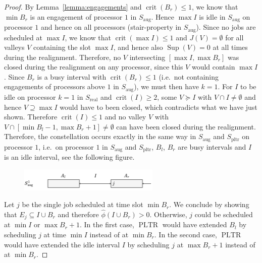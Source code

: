 \documentclass[a4paper]{article}
\DeclareMathOperator{\pltr}{pltr}
\DeclareMathOperator{\PLTR}{PLTR}
\DeclareMathOperator{\aug}{aug}
\DeclareMathOperator{\real}{real}
\DeclareMathOperator{\crit}{crit}
\DeclareMathOperator{\res}{Sup}
\begin{document}
\begin{proof}
  By Lemma~\ref{lemma:engagements} and $\crit(B_r) \leq 1$, we know that $\min B_r$ is an engagement of processor $1$ in $S_{\aug}$.
  Hence $\max I$ is idle in $S_{\aug}$ on processor $1$ and hence on all processors (stair-property in $S_{\aug}$).
  Since no jobs are scheduled at $\max I$, we know that $\crit(\max I) \leq 1$ and $J(V) = \emptyset$ for all valleys $V$ containing the slot $\max I$, and hence also $\res(V) = 0$ at all times during the realignment.
  Therefore, no $V$ intersecting $[\max I, \max B_r]$ was closed during the realignment on any processor, since this $V$ would contain $\max I$.
  Since $B_r$ is a busy interval with $\crit(B_r) \leq 1$ (i.e.\ not containing engagements of processors above $1$ in $S_{\aug}$), we must then have $k = 1$.
  For $I$ to be idle on processor $k = 1$ in $S_{\real}$ and $\crit(I) \geq 2$, some $V \succeq I$ with $V \cap I \neq \emptyset$ and hence $V \supseteq \max I$ would have to been closed, which contradicts what we have just shown.
  Therefore $\crit(I) \leq 1$ and no valley $V$ with $V \cap [\min B_l - 1, \max B_r + 1] \neq \emptyset$ can have been closed during the realignment.
  Therefore, the constellation occurs exactly in the same way in $S_{\aug}$ and $S_{\pltr}$ on processor $1$, i.e.\ on processor $1$ in $S_{\aug}$ and $S_{\pltr}$, $B_l$, $B_r$ are busy intervals and $I$ is an idle interval, see the following figure.

  \begin{figure}[H]
    \centering
    \includegraphics[width=0.6\textwidth]{graphics/constellation.jpg}
    \label{fig:constellation}
  \end{figure}
  Let $j$ be the single job scheduled at time slot $\min B_r$.
  We conclude by showing that $E_j \subseteq I \cup B_r$ and therefore $\hat \phi(I \cup B_r) > 0$.
  Otherwise, $j$ could be scheduled at $\min I$ or $\max B_r + 1$.
  In the first case, $\PLTR$ would have extended $B_l$ by scheduling $j$ at time $\min I$ instead of at $\min B_r$.
  In the second case, $\PLTR$ would have extended the idle interval $I$ by scheduling $j$ at $\max B_r + 1$ instead of at $\min B_r$.
\end{proof}
\end{document}
